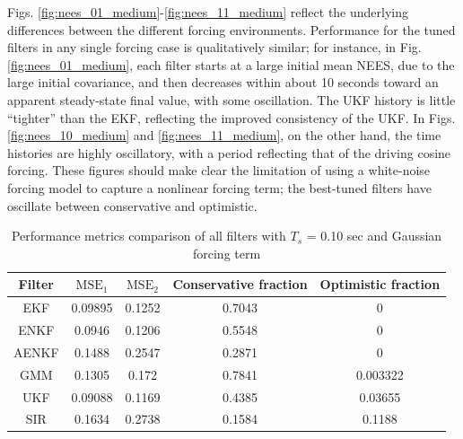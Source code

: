 \documentclass[]{article}
\begin{document}
Figs. \ref{fig:nees_01_medium}-\ref{fig:nees_11_medium} reflect the underlying differences between the different forcing environments. Performance for the tuned filters in any single forcing case is qualitatively similar; for instance, in Fig. \ref{fig:nees_01_medium}, each filter starts at a large initial mean NEES, due to the large initial covariance, and then decreases within about 10 seconds toward an apparent steady-state final value, with some oscillation. The UKF history is little ``tighter'' than the EKF, reflecting the improved consistency of the UKF. In Figs. \ref{fig:nees_10_medium} and \ref{fig:nees_11_medium}, on the other hand, the time histories are highly oscillatory, with a period reflecting that of the driving cosine forcing. These figures should make clear the limitation of using a white-noise forcing model to capture a nonlinear forcing term; the best-tuned filters have oscillate between conservative and optimistic.

\begin{table}[h!]
\centering
\begin{tabular}{|c|c|c|c|c|}
\hline
Filter & $\mathrm{MSE}_1$ & $\mathrm{MSE}_2$ & Conservative fraction & Optimistic fraction \\
\hline
EKF &  0.09895 &   0.1252 &   0.7043 &        0 \\
\hline
ENKF &   0.0946 &   0.1206 &   0.5548 &        0 \\
\hline
AENKF &   0.1488 &   0.2547 &   0.2871 &        0 \\
\hline
GMM &   0.1305 &    0.172 &   0.7841 & 0.003322 \\
\hline
UKF &  0.09088 &   0.1169 &   0.4385 &  0.03655 \\
\hline
SIR &   0.1634 &   0.2738 &   0.1584 &   0.1188 \\
\hline
\end{tabular}
\caption{Performance metrics comparison of all filters with $T_s$ = 0.10 sec and Gaussian forcing term}
\label{table:compare_case_1_sample_0}
\end{table}
\end{document}
